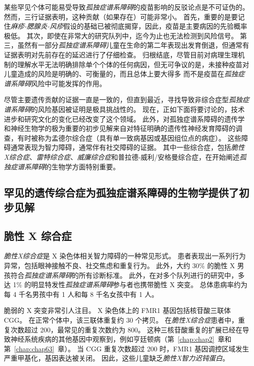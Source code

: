 某些罕见个体可能易受导致\textit{孤独症谱系障碍}的疫苗影响的反驳论点是不可证伪的。
然而，三行证据表明，这种贡献（如果存在）可能非常小。
首先，重要的是要记住\textit{麻疹-腮腺炎-风疹}假设的基础已被彻底揭穿，因此，疫苗是主要病因的先验概率极低。
其次，即使在非常大的研究队列中，迄今为止也无法检测到风险信号。
第三，虽然有一部分\textit{孤独症谱系障碍}儿童在生命的第二年表现出发育倒退，但通常有证据表明对先前存在的延迟进行了仔细检查。
归根结底，尽管目前对病理生理机制的理解水平无法明确排除单个个体的任何病因，但无可争议的是，未接种疫苗对儿童造成的风险是明确的、可衡量的，而且总体上要大得多 而不是疫苗在\textit{孤独症谱系障碍}风险中可能发挥的作用。


尽管主要遗传贡献的证据一直是一致的，但直到最近，寻找导致非综合症型\textit{孤独症谱系障碍}的风险基因被证明是极具挑战性的。
现在，正如下面将要讨论的，技术进步和研究文化的变化已经改变了这个领域。
此外，对孤独症谱系障碍的遗传学和神经生物学的极为重要的初步见解来自对特征明确的遗传性神经发育障碍的调查，有时被称为孟德尔综合症（具有单一致病基因或基因组位点的病症）。
这些障碍通常表现为智力障碍，通常伴有社交障碍的证据。
其中一些综合症，包括\textit{脆性X综合症}、\textit{雷特综合症}、\textit{威廉综合症}和普拉德-威利/安格曼综合症，在开始阐述\textit{孤独症谱系障碍}的生物学方面特别重要。



\subsection{罕见的遗传综合症为孤独症谱系障碍的生物学提供了初步见解}

\subsection{脆性 X 综合症}

\textit{脆性X综合症}是 X 染色体相关智力障碍的一种常见形式。
患者表现出一系列行为异常，包括眼神接触不良、社交焦虑和重复行为。
此外，大约 30\% 的脆性 X 男孩符合\textit{孤独症谱系障碍}的所有诊断标准。
此外，在对多个队列进行的研究中，多达 1\% 的明显特发性\textit{孤独症谱系障碍}参与者也携带脆性 X 突变。
总体患病率约为每 4 千名男孩中有 1 人和每 8 千名女孩中有 1 人。


脆弱的 X 突变非常引人注目。
X 染色体上的 FMR1 基因包括核苷酸三联体 CGG。
在正常个体中，该三联体重复约 30 个拷贝。
在\textit{脆性X综合症}患者中，重复次数超过 200，最常见的重复次数约为 800。
这种三核苷酸重复的扩展已经在导致神经系统疾病的其他基因中观察到，例如亨廷顿病（第~\ref{chap:chap2}~章和第~\ref{chap:chap63}~章）。
当 CGG 重复次数超过 200 时，FMR1 基因调控区域发生严重甲基化，基因表达被关闭。
因此，这些儿童缺乏\textit{脆性X智力迟钝蛋白}。


